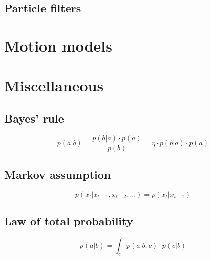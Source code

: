 \documentclass{article}
\begin{document}
\subsection{Particle filters}

\section{Motion models}

\section{Miscellaneous}

\subsection{Bayes' rule}
\begin{equation}\label{bayes}
  p(a \vert b) = \frac{p(b \vert a) \cdot p(a)}{p(b)}
    = \eta \cdot p(b \vert a) \cdot p(a)
\end{equation}

\subsection{Markov assumption}
\begin{equation}\label{markov}
  p(x_t \vert x_{t-1}, x_{t-2}, \dots) = p(x_t \vert x_{t-1})
\end{equation}

\subsection{Law of total probability}
\begin{equation}\label{totalprobability}
  p(a \vert b) = \int_{c} p(a \vert b, c) \cdot p(c \vert b)
\end{equation}

\printbibliography{}
\end{document}
